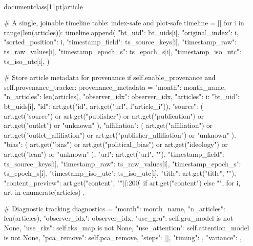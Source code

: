 \\documentclass[11pt]{article}
\begin{document}
\begin{CodeBlock}
        # A single, joinable timeline table: index-safe and plot-safe
        timeline = []
        for i in range(len(articles)):
            timeline.append({
                "bt_uid": bt_uids[i],
                "original_index": i,
                "sorted_position": i,
                "timestamp_field": ts_source_keys[i],
                "timestamp_raw": ts_raw_values[i],
                "timestamp_epoch_s": ts_epoch_s[i],
                "timestamp_iso_utc": ts_iso_utc[i],
            })

        # Store article metadata for provenance
        if self.enable_provenance and self.provenance_tracker:
            provenance_metadata = {
                "month": month_name,
                "n_articles": len(articles),
                "observer_idx": observer_idx,
                "articles": {
                    i: {
                        "bt_uid": bt_uids[i],
                        "id": art.get("id", art.get("url", f"article_{i}")),
                        "source": (
                            art.get("source")
                            or art.get("publisher")
                            or art.get("publication")
                            or art.get("outlet")
                            or "unknown"
                        ),
                        "affiliation": (
                            art.get("affiliation")
                            or art.get("outlet_affiliation")
                            or art.get("publisher_affiliation")
                            or "unknown"
                        ),
                        "bias": (
                            art.get("bias")
                            or art.get("political_bias")
                            or art.get("ideology")
                            or art.get("lean")
                            or "unknown"
                        ),
                        "url": art.get("url", ""),
                        "timestamp_field": ts_source_keys[i],
                        "timestamp_raw": ts_raw_values[i],
                        "timestamp_epoch_s": ts_epoch_s[i],
                        "timestamp_iso_utc": ts_iso_utc[i],
                        "title": art.get("title", ""),
                        "content_preview": art.get("content", "")[:200] if art.get("content") else "",
                    }
                    for i, art in enumerate(articles)
                },
            }

        # Diagnostic tracking
        diagnostics = {
            "month": month_name,
            "n_articles": len(articles),
            "observer_idx": observer_idx,
            "use_gru": self.gru_model is not None,
            "use_rks": self.rks_map is not None,
            "use_attention": self.attention_model is not None,
            "pca_remove": self.pca_remove,
            "steps": [],
            "timing": {},
            "variance": {},
        }


\end{CodeBlock}
\end{document}
